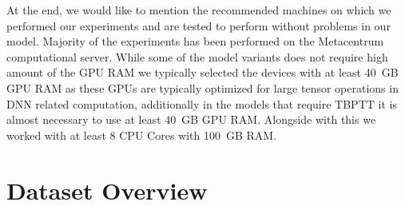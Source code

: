 At the end, we would like to mention the recommended machines on which we performed our experiments and are tested to perform without problems in our model. Majority of the experiments has been performed on the Metacentrum computational server. While some of the model variants does not require high amount of the GPU RAM we typically selected the devices with at least 40~GB GPU RAM as these GPUs are typically optimized for large tensor operations in DNN related computation, additionally in the models that require TBPTT it is almost necessary to use at least 40~GB GPU RAM. Alongside with this we worked with at least 8 CPU Cores with 100~GB RAM.

\section{Dataset Overview}
\label{sec:dataset_overview}

